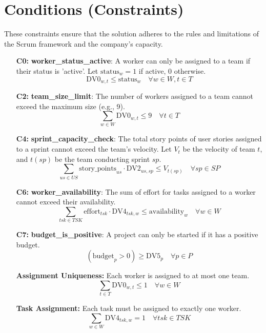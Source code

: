 \documentclass{article}
\begin{document}
\section{Conditions (Constraints)}
These constraints ensure that the solution adheres to the rules and limitations of the Scrum framework and the company's capacity.
\begin{itemize}
    \item[\textbf{C0:}] \textbf{worker\_status\_active}: A worker can only be assigned to a team if their status is 'active'. Let $\text{status}_w = 1$ if active, 0 otherwise.
    \begin{equation*}
        \text{DV0}_{w,t} \leq \text{status}_w \quad \forall w \in W, t \in T
    \end{equation*}
    \item[\textbf{C2:}] \textbf{team\_size\_limit}: The number of workers assigned to a team cannot exceed the maximum size (e.g., 9).
    \begin{equation*}
        \sum_{w \in W} \text{DV0}_{w,t} \leq 9 \quad \forall t \in T
    \end{equation*}
    \item[\textbf{C4:}] \textbf{sprint\_capacity\_check}: The total story points of user stories assigned to a sprint cannot exceed the team's velocity. Let $V_t$ be the velocity of team $t$, and $t(sp)$ be the team conducting sprint $sp$.
    \begin{equation*}
        \sum_{us \in US} \text{story\_points}_{us} \cdot \text{DV2}_{us,sp} \leq V_{t(sp)} \quad \forall sp \in SP
    \end{equation*}
    \item[\textbf{C6:}] \textbf{worker\_availability}: The sum of effort for tasks assigned to a worker cannot exceed their availability.
    \begin{equation*}
        \sum_{tsk \in TSK} \text{effort}_{tsk} \cdot \text{DV4}_{tsk,w} \leq \text{availability}_w \quad \forall w \in W
    \end{equation*}
    \item[\textbf{C7:}] \textbf{budget\_is\_positive}: A project can only be started if it has a positive budget.
    \begin{equation*}
         (\text{budget}_p > 0) \geq \text{DV5}_p  \quad \forall p \in P
    \end{equation*}
    \item[\textbf{Assignment Uniqueness:}] Each worker is assigned to at most one team.
    \begin{equation*}
        \sum_{t \in T} \text{DV0}_{w,t} \leq 1 \quad \forall w \in W
    \end{equation*}
     \item[\textbf{Task Assignment:}] Each task must be assigned to exactly one worker.
    \begin{equation*}
        \sum_{w \in W} \text{DV4}_{tsk,w} = 1 \quad \forall tsk \in TSK
    \end{equation*}
\end{itemize}
\end{document}
